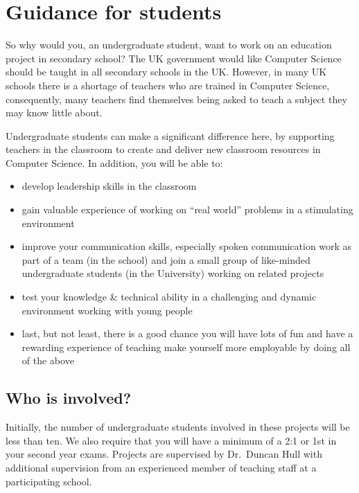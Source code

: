 \documentclass[12pt,]{book}
\providecommand{\tightlist}{%
  \setlength{\itemsep}{0pt}\setlength{\parskip}{0pt}}
\begin{document}
\hypertarget{guidance-for-students}{%
\section{Guidance for students}\label{guidance-for-students}}

So why would you, an undergraduate student, want to work on an education project in secondary school? The UK government would like Computer Science should be taught in all secondary schools in the UK.\citep{afterthereboot} However, in many UK schools there is a shortage of teachers who are trained in Computer Science, consequently, many teachers find themselves being asked to teach a subject they may know little about.\citep{shutdownrestart}

Undergraduate students can make a significant difference here, by supporting teachers in the classroom to create and deliver new classroom resources in Computer Science.\citep{computinged} In addition, you will be able to:

\begin{itemize}
\tightlist
\item
  develop leadership skills in the classroom
\item
  gain valuable experience of working on ``real world'' problems in a stimulating environment
\item
  improve your communication skills, especially spoken communication
  work as part of a team (in the school) and join a small group of like-minded undergraduate students (in the University) working on related projects
\item
  test your knowledge \& technical ability in a challenging and dynamic environment working with young people
\item
  last, but not least, there is a good chance you will have lots of fun and have a rewarding experience of teaching
  make yourself more employable by doing all of the above
\end{itemize}

\hypertarget{who-is-involved}{%
\subsection{Who is involved?}\label{who-is-involved}}

Initially, the number of undergraduate students involved in these projects will be less than ten. We also require that you will have a minimum of a 2:1 or 1st in your second year exams. Projects are supervised by Dr.~Duncan Hull with additional supervision from an experienced member of teaching staff at a participating school.
\end{document}
